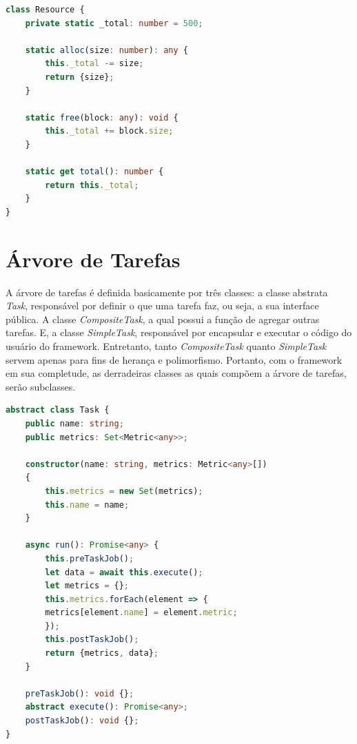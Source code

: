 \documentclass[12pt]{tcc}
\begin{document}
\begin{lstlisting}[label={lst:mock_memoria}, caption={Implementação da classe responsável por simular recursos de memória para a prova de conceito do framework.}, language=TypeScript]
class Resource {
    private static _total: number = 500;

    static alloc(size: number): any {
        this._total -= size;
        return {size};
    }

    static free(block: any): void {
        this._total += block.size;
    }

    static get total(): number {
        return this._total;
    }
}
\end{lstlisting}


\section{Árvore de Tarefas}

A árvore de tarefas é definida basicamente por três classes:
a classe abstrata \emph{Task}, responsável por definir o que uma tarefa faz, ou seja, a sua interface pública.
A classe \emph{CompositeTask}, a qual possui a função de agregar outras tarefas.
E, a classe \emph{SimpleTask}, responsável por encapsular e executar o código do usuário do framework.
Entretanto, tanto \emph{CompositeTask} quanto \emph{SimpleTask} servem apenas para fins de herança e polimorfismo.
Portanto, com o framework em sua completude, as derradeiras classes as quais compõem a árvore de tarefas, serão subclasses.

\begin{lstlisting}[label={lst:abstract_task}, caption={Classe abstrata responsável por definir o que todos os membros da árvore de tarefas precisam implementar.}, language=TypeScript]
abstract class Task {
    public name: string;
    public metrics: Set<Metric<any>>;

    constructor(name: string, metrics: Metric<any>[])
    {
        this.metrics = new Set(metrics);
        this.name = name;
    }

    async run(): Promise<any> {
        this.preTaskJob();
        let data = await this.execute();
        let metrics = {};
        this.metrics.forEach(element => {
        metrics[element.name] = element.metric;
        });
        this.postTaskJob();
        return {metrics, data};
    }

    preTaskJob(): void {};
    abstract execute(): Promise<any>;
    postTaskJob(): void {};
}
\end{lstlisting}
\end{document}
